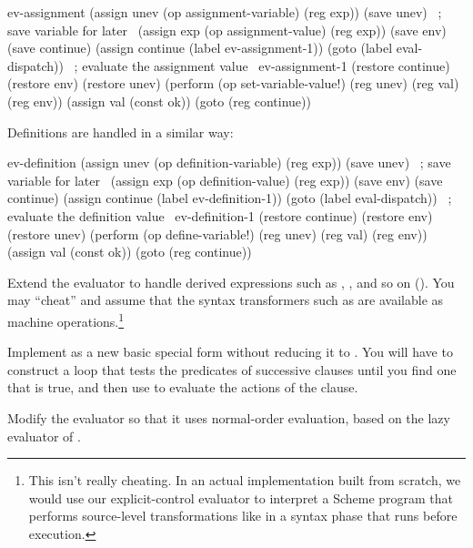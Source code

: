 \begin{codeBlock}
ev-assignment
  (assign unev (op assignment-variable) (reg exp))
  (save unev)                   ~\textrm{; save variable for later}~
  (assign exp (op assignment-value) (reg exp))
  (save env)
  (save continue)
  (assign continue (label ev-assignment-1))
  (goto (label eval-dispatch))  ~\textrm{; evaluate the assignment value}~
ev-assignment-1
  (restore continue)
  (restore env)
  (restore unev)
  (perform (op set-variable-value!)
           (reg unev)
           (reg val)
           (reg env))
  (assign val (const ok))
  (goto (reg continue))
\end{codeBlock}

\noindent
Definitions are handled in a similar way:

\begin{codeBlock}
ev-definition
  (assign unev (op definition-variable) (reg exp))
  (save unev)                   ~\textrm{; save variable for later}~
  (assign exp (op definition-value) (reg exp))
  (save env)
  (save continue)
  (assign continue (label ev-definition-1))
  (goto (label eval-dispatch))  ~\textrm{; evaluate the definition value}~
ev-definition-1
  (restore continue)
  (restore env)
  (restore unev)
  (perform (op define-variable!)
           (reg unev)
           (reg val)
           (reg env))
  (assign val (const ok))
  (goto (reg continue))
\end{codeBlock}

\begin{exerciseGroup}
\label{Exercise 5.23}
 Extend the evaluator to handle
derived expressions such as , , and so on
().  You may ``cheat'' and assume that the syntax transformers such
as  are available as machine operations.\footnote{This isn't
really cheating.  In an actual implementation built from scratch, we would use
our explicit-control evaluator to interpret a Scheme program that performs
source-level transformations like  in a syntax phase that runs
before execution.}

\label{Exercise 5.24}
 Implement  as a new
basic special form without reducing it to .  You will have to
construct a loop that tests the predicates of successive  clauses
until you find one that is true, and then use  to evaluate
the actions of the clause.

\label{Exercise 5.25}
 Modify the evaluator so that it
uses normal-order evaluation, based on the lazy evaluator of .
\end{exerciseGroup}

